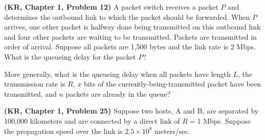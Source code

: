 \documentclass[a4paper,11pt]{exam}
\begin{document}
\begin{questions}
\question \textbf{(KR, Chapter 1, Problem 12)} A packet switch receives a packet $P$ and determines the outbound link to which the packet should be forwarded.  When $P$ arrives, one other packet is halfway done being transmitted on this outbound link and four other packets are waiting to be transmitted. Packets are transmitted in order of arrival.  Suppose all packets are 1,500 bytes and the link rate is 2 Mbps.  What is the queueing delay for the packet $P$?  

More generally, what is the queueing delay when all packets have length $L$, the transmission rate is $R$, $x$ bits of the currently-being-transmitted packet have been transmitted, and $n$ packets are already in the queue?
  

\question \textbf{(KR, Chapter 1, Problem 25)} 
Suppose two hosts, A and B, are separated by 100,000 kilometers
and are connected by a direct link of $R = 1$ Mbps.  Suppose the
propagation speed over the link is $2.5 \times 10^8$ meters/sec.


\end{questions}
\end{document}
